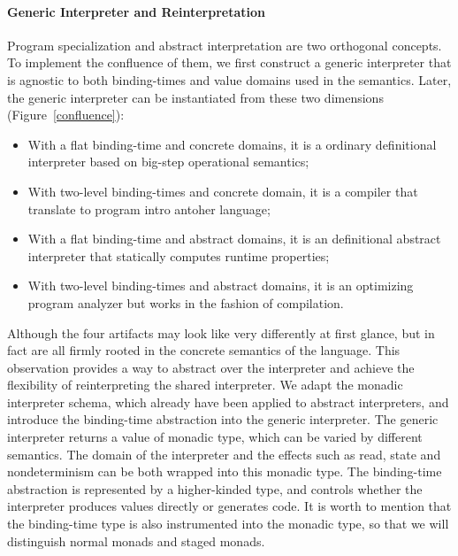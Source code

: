 

\paragraph{Generic Interpreter and Reinterpretation}

Program specialization and abstract interpretation are two orthogonal
concepts.  To implement the confluence of them, we first construct a
generic interpreter that is agnostic to both binding-times and value
domains used in the semantics.  Later, the generic interpreter can be
instantiated from these two dimensions (Figure~\ref{confluence}):
\begin{itemize}
\item With a flat binding-time and concrete domains, it is a ordinary
  definitional interpreter based on big-step operational semantics;
\item With two-level binding-times and concrete domain, it is a
  compiler that translate to program intro antoher language;
\item With a flat binding-time and abstract domains, it is an
  definitional abstract interpreter \cite{DBLP:journals/pacmpl/DaraisLNH17}
  that statically computes runtime properties;
\item With two-level binding-times and abstract domains, it is an optimizing
  program analyzer but works in the fashion of compilation.
\end{itemize}

Although the four artifacts may look like very differently at first
glance, but in fact are all firmly rooted in the concrete semantics of
the language.  This observation provides a way to abstract over the
interpreter and achieve the flexibility of reinterpreting the shared
interpreter. We adapt the monadic interpreter schema, which already
have been applied to abstract interpreters, and introduce the
binding-time abstraction into the generic interpreter.  The generic
interpreter returns a value of monadic type, which can be varied by
different semantics. The domain of the interpreter and the effects
such as read, state and nondeterminism can be both wrapped into this
monadic type.  The binding-time abstraction is represented by a
higher-kinded type, and controls whether the interpreter produces
values directly or generates code.  It is worth to mention that the
binding-time type is also instrumented into the monadic type, so that
we will distinguish normal monads and staged monads.

